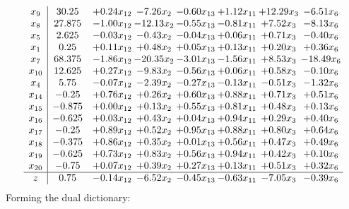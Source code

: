 \documentclass[8pt]{article}
\begin{document}
\[\begin{array}{c| c c@{\hskip 2pt} c@{\hskip 2pt} c@{\hskip 2pt} c@{\hskip 2pt} c@{\hskip 2pt} c@{\hskip 2pt} }
 x_{9}   &  30.25 & +  0.24 x_{12} & -7.26 x_{2} & -0.60 x_{13} & +  1.12 x_{11} & + 12.29 x_{3} & -6.51 x_{6}\\
 x_{8}   &  27.875 & -1.00 x_{12} & -12.13 x_{2} & -0.55 x_{13} & -0.81 x_{11} & +  7.52 x_{3} & -8.13 x_{6}\\
 x_{5}   &  2.625 & -0.03 x_{12} & -0.43 x_{2} & -0.04 x_{13} & +  0.06 x_{11} & +  0.71 x_{3} & -0.40 x_{6}\\
 x_{1}   &  0.25 & +  0.11 x_{12} & +  0.48 x_{2} & +  0.05 x_{13} & +  0.13 x_{11} & +  0.20 x_{3} & +  0.36 x_{6}\\
 x_{7}   &  68.375 & -1.86 x_{12} & -20.35 x_{2} & -3.01 x_{13} & -1.56 x_{11} & +  8.53 x_{3} & -18.49 x_{6}\\
 x_{10}   &  12.625 & +  0.27 x_{12} & -9.83 x_{2} & -0.56 x_{13} & +  0.06 x_{11} & +  0.58 x_{3} & -0.10 x_{6}\\
 x_{4}   &  5.75 & -0.07 x_{12} & -2.39 x_{2} & -0.27 x_{13} & -0.13 x_{11} & -0.51 x_{3} & -1.32 x_{6}\\
 x_{14}   &  -0.25 & +  0.76 x_{12} & +  0.26 x_{2} & +  0.60 x_{13} & +  0.88 x_{11} & +  0.71 x_{3} & +  0.51 x_{6}\\
 x_{15}   &  -0.875 & +  0.00 x_{12} & +  0.13 x_{2} & +  0.55 x_{13} & +  0.81 x_{11} & +  0.48 x_{3} & +  0.13 x_{6}\\
 x_{16}   &  -0.625 & +  0.03 x_{12} & +  0.43 x_{2} & +  0.04 x_{13} & +  0.94 x_{11} & +  0.29 x_{3} & +  0.40 x_{6}\\
 x_{17}   &  -0.25 & +  0.89 x_{12} & +  0.52 x_{2} & +  0.95 x_{13} & +  0.88 x_{11} & +  0.80 x_{3} & +  0.64 x_{6}\\
 x_{18}   &  -0.375 & +  0.86 x_{12} & +  0.35 x_{2} & +  0.01 x_{13} & +  0.56 x_{11} & +  0.47 x_{3} & +  0.49 x_{6}\\
 x_{19}   &  -0.625 & +  0.73 x_{12} & +  0.83 x_{2} & +  0.56 x_{13} & +  0.94 x_{11} & +  0.42 x_{3} & +  0.10 x_{6}\\
 x_{20}   &  -0.75 & +  0.07 x_{12} & +  0.39 x_{2} & +  0.27 x_{13} & +  0.13 x_{11} & +  0.51 x_{3} & +  0.32 x_{6}\\
\hline
z    &  0.75 & -0.14 x_{12} & -6.52 x_{2} & -0.45 x_{13} & -0.63 x_{11} & -7.05 x_{3} & -0.39 x_{6}\\
\end{array}\]
Forming the dual dictionary:
\end{document}
